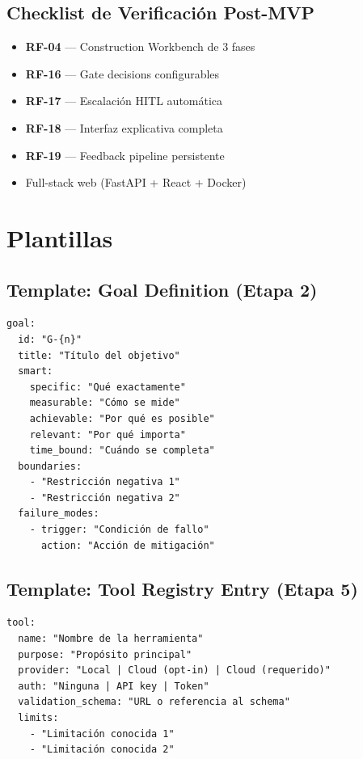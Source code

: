 \documentclass[12pt,a4paper]{article}
\begin{document}
\subsection{Checklist de Verificación Post-MVP}
\begin{itemize}
  \item[{${[\;]}$}] \textbf{RF-04} --- Construction Workbench de 3 fases
  \item[{${[\;]}$}] \textbf{RF-16} --- Gate decisions configurables
  \item[{${[\;]}$}] \textbf{RF-17} --- Escalación HITL automática
  \item[{${[\;]}$}] \textbf{RF-18} --- Interfaz explicativa completa
  \item[{${[\;]}$}] \textbf{RF-19} --- Feedback pipeline persistente
  \item[{${[\;]}$}] Full-stack web (FastAPI + React + Docker)
\end{itemize}

\section{Plantillas}

\subsection{Template: Goal Definition (Etapa 2)}

\begin{lstlisting}[style=yaml, caption={Template para definición de objetivos SMART}]
goal:
  id: "G-{n}"
  title: "Título del objetivo"
  smart:
    specific: "Qué exactamente"
    measurable: "Cómo se mide"
    achievable: "Por qué es posible"
    relevant: "Por qué importa"
    time_bound: "Cuándo se completa"
  boundaries:
    - "Restricción negativa 1"
    - "Restricción negativa 2"
  failure_modes:
    - trigger: "Condición de fallo"
      action: "Acción de mitigación"
\end{lstlisting}

\subsection{Template: Tool Registry Entry (Etapa 5)}

\begin{lstlisting}[style=yaml, caption={Template para registro de herramientas}]
tool:
  name: "Nombre de la herramienta"
  purpose: "Propósito principal"
  provider: "Local | Cloud (opt-in) | Cloud (requerido)"
  auth: "Ninguna | API key | Token"
  validation_schema: "URL o referencia al schema"
  limits:
    - "Limitación conocida 1"
    - "Limitación conocida 2"
\end{lstlisting}
\end{document}
